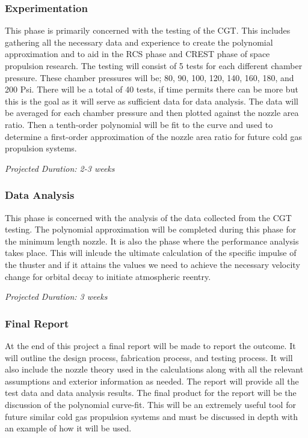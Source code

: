 \documentclass[conference]{IEEEtran} %
\begin{document}
\subsubsection{Experimentation}
\label{subsubsec:experimentation}
    This phase is primarily concerned with the testing of the CGT\@. This includes gathering all the necessary data and experience to create the
    polynomial approximation and to aid in the RCS phase and CREST phase of space propulsion research.
    The testing will consist of 5 tests for each different chamber pressure. These chamber pressures will be; 80, 90, 100, 120, 140, 160, 180, and 200 Psi. There
    will be a total of 40 tests, if time permits there can be more but this is the goal as it will serve as sufficient data for data analysis.
     The data will be averaged for each chamber pressure and then plotted against the nozzle area ratio. Then a tenth-order polynomial
    will be fit to the curve and used to determine a first-order approximation of the nozzle area ratio for future cold gas propulsion systems.

    \textit{Projected Duration: 2-3 weeks}

\subsubsection{Data Analysis}
\label{subsubsec: data analysis}
    This phase is concerned with the analysis of the data collected from the CGT testing. The polynomial approximation will be completed during this
    phase for the minimum length nozzle. It is also the phase where the performance analysis takes place. This will inlcude the ultimate calculation of the specific impulse
    of the thuster and if it attains the values we need to achieve the necessary velocity change for orbital decay to initiate atmospheric reentry.

    \textit{Projected Duration: 3 weeks}

\subsubsection{Final Report}
\label{subsubsec: final report}
    At the end of this project a final report will be made to report the outcome. It will outline the design process, fabrication process, and testing process.
    It will also include the nozzle theory used in the calculations along with all the relevant assumptions and exterior information as needed. The report will provide
    all the test data and data analysis results. The final product for the report will be the discussion of the polynomial curve-fit. This will be an extremely useful tool
    for future similar cold gas propulsion systems and must be discussed in depth with an example of how it will be used.
\end{document}
